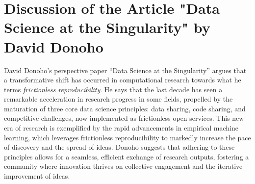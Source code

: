 \documentclass[]{hdsr}
\begin{document}
\vspace{1cm}

\section*{Discussion of the Article "Data Science at the Singularity" by David Donoho}
\label{intro}
David Donoho's perspective paper ``Data Science at the Singularity'' argues that a transformative shift has occurred in computational research towards what he terms \emph{frictionless reproducibility}. He says that the last decade has seen a remarkable acceleration in research progress in some fields, propelled by the maturation of three core data science principles: data sharing, code sharing, and competitive challenges, now implemented as frictionless open services. This new era of research is exemplified by the rapid advancements in empirical machine learning, which leverages frictionless reproducibility to markedly increase the pace of discovery and the spread of ideas. Donoho suggests that adhering to these principles allows for a seamless, efficient exchange of research outputs, fostering a community where innovation thrives on collective engagement and the iterative improvement of ideas.


\restoregeometry
{}
\end{document}

